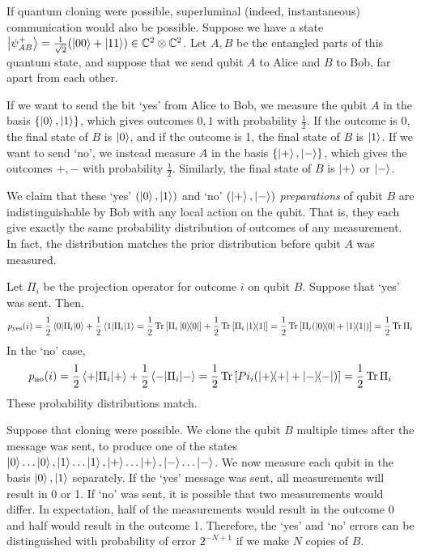 If quantum cloning were possible, superluminal (indeed, instantaneous) communication would also be possible.
Suppose we have a state \( \ket{\psi^+_{AB}} = \frac{1}{\sqrt{2}} \qty(\ket{00} + \ket{11}) \in \mathbb C^2 \otimes \mathbb C^2 \).
Let \( A, B \) be the entangled parts of this quantum state, and suppose that we send qubit \( A \) to Alice and \( B \) to Bob, far apart from each other.

If we want to send the bit `yes' from Alice to Bob, we measure the qubit \( A \) in the basis \( \qty{\ket{0}, \ket{1}} \), which gives outcomes \( 0, 1 \) with probability \( \frac{1}{2} \).
If the outcome is 0, the final state of \( B \) is \( \ket{0} \), and if the outcome is 1, the final state of \( B \) is \( \ket{1} \).
If we want to send `no', we instead measure \( A \) in the basis \( \qty{\ket{+}, \ket{-}} \), which gives the outcomes \( +, - \) with probability \( \frac{1}{2} \).
Similarly, the final state of \( B \) is \( \ket{+} \) or \( \ket{-} \).

We claim that these `yes' \( (\ket{0}, \ket{1}) \) and `no' \( (\ket{+}, \ket{-}) \) \emph{preparations} of qubit \( B \) are indistinguishable by Bob with any local action on the qubit.
That is, they each give exactly the same probability distribution of outcomes of any measurement.
In fact, the distribution matches the prior distribution before qubit \( A \) was measured.

Let \( \Pi_i \) be the projection operator for outcome \( i \) on qubit \( B \).
Suppose that `yes' was sent.
Then,
\[ p_{\text{yes}}(i) = \frac{1}{2}\ev{\Pi_i}{0} + \frac{1}{2}\ev{\Pi_i}{1} = \frac{1}{2} \Tr \qty[\Pi_i \op{0}{0}] + \frac{1}{2} \Tr \qty[\Pi_i \op{1}{1}] = \frac{1}{2} \Tr \qty[\Pi_i \qty(\op{0}{0} + \op{1}{1})] = \frac{1}{2} \Tr \Pi_i \]
In the `no' case,
\[ p_{\text{no}}(i) = \frac{1}{2}\ev{\Pi_i}{+} + \frac{1}{2}\ev{\Pi_i}{-} = \frac{1}{2} \Tr \qty[Pi_i \qty(\op{+}{+} + \op{-}{-})] = \frac{1}{2} \Tr \Pi_i \]
These probability distributions match.

Suppose that cloning were possible.
We clone the qubit \( B \) multiple times after the message was sent, to produce one of the states \( \ket{0} \dots \ket{0}, \ket{1} \dots \ket{1}, \ket{+} \dots \ket{+}, \ket{-} \dots \ket{-} \).
We now measure each qubit in the basis \( \ket{0}, \ket{1} \) separately.
If the `yes' message was sent, all measurements will result in 0 or 1.
If `no' was sent, it is possible that two measurements would differ.
In expectation, half of the measurements would result in the outcome 0 and half would result in the outcome 1.
Therefore, the `yes' and `no' errors can be distinguished with probability of error \( 2^{-N+1} \) if we make \( N \) copies of \( B \).

